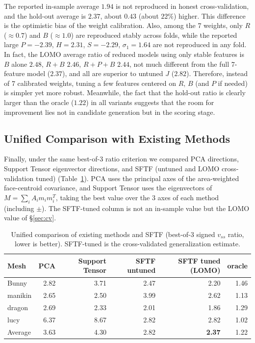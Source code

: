 \documentclass[11pt,a4paper]{article}
\begin{document}
The reported in-sample average $1.94$ is not reproduced in honest cross-validation,
and the hold-out average is $2.37$, about $0.43$ (about $22\%$) higher. This difference is the optimistic bias of the weight calibration.
Also, among the 7 weights, only $R$ ($\approx 0.7$) and $B$ ($\approx 1.0$) are reproduced stably across folds,
while the reported large $P=-2.39$, $H=2.31$, $S=-2.29$, $\sigma_1=1.64$ are not reproduced in any fold.
In fact, the LOMO average ratio of reduced models using only stable features is
$B$ alone $2.48$, $R+B$ $2.46$, $R+P+B$ $2.44$, not much different from the full 7-feature model ($2.37$),
and all are superior to untuned $J$ ($2.82$).
Therefore, instead of 7 calibrated weights, tuning a few features centered on $R$, $B$ (and $P$ if needed) is simpler yet more robust.
Meanwhile, the fact that the hold-out ratio is clearly larger than the oracle ($1.22$) in all variants suggests
that the room for improvement lies not in candidate generation but in the scoring stage.

\subsection{Unified Comparison with Existing Methods}
\label{sec:baseline}

Finally, under the same best-of-3 ratio criterion we compared PCA directions, Support Tensor eigenvector directions,
and SFTF (untuned and LOMO cross-validation tuned) (Table~\ref{tab:unified}).
PCA
uses the principal axes of the area-weighted face-centroid covariance, and Support Tensor uses the eigenvectors of $M=\sum_i A_i m_i m_i^T$,
taking the best value over the 3 axes of each method (including $\pm$).
The SFTF-tuned column is not an in-sample value but the LOMO value of \S\ref{sec:cv}.

\begin{table}[H]
\centering
\caption{Unified comparison of existing methods and SFTF (best-of-3 signed $v_{ss}$ ratio, lower is better).
SFTF-tuned is the cross-validated generalization estimate.}
\label{tab:unified}
\begin{tabular}{lrrrrr}
\toprule
Mesh & PCA & Support Tensor & SFTF untuned & SFTF tuned (LOMO) & oracle\\
\midrule
Bunny    & 2.82 & 3.71 & 2.47 & 2.20 & 1.46\\
manikin  & 2.65 & 2.50 & 3.99 & 2.62 & 1.13\\
dragon   & 2.69 & 2.33 & 2.01 & 1.86 & 1.29\\
lucy     & 6.37 & 8.67 & 2.82 & 2.82 & 1.02\\
\midrule
Average     & 3.63 & 4.30 & 2.82 & \textbf{2.37} & 1.22\\
\bottomrule
\end{tabular}
\end{table}
\end{document}
